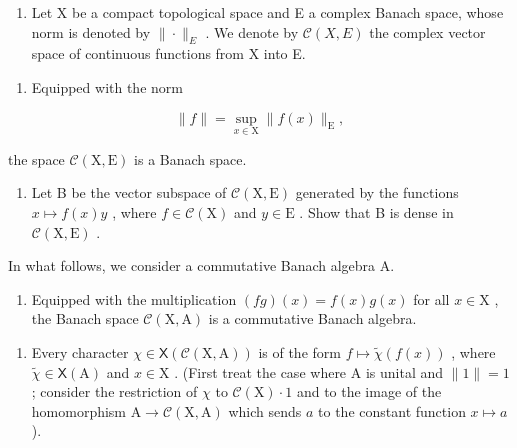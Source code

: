 \begin{enumerate}
\def\labelenumi{\arabic{enumi})}
\setcounter{enumi}{25}
\tightlist
\item
  Let X be a compact topological space and E a complex Banach space, whose norm is denoted by \(\|\cdot\|_{E}\) . We denote by \(\mathcal{C}(X,E)\) the complex vector space of continuous functions from X into E.
\end{enumerate}

\begin{enumerate}
\def\labelenumi{\alph{enumi})}
\tightlist
\item
  Equipped with the norm
\end{enumerate}

\[
\| f \| = \sup _ {x \in \mathrm{X}} \| f (x) \| _ {\mathrm{E}},
\]

the space \(\mathcal{C}(\mathrm{X},\mathrm{E})\) is a Banach space.

\begin{enumerate}
\def\labelenumi{\alph{enumi})}
\setcounter{enumi}{1}
\tightlist
\item
  Let B be the vector subspace of \(\mathcal{C}(\mathrm{X},\mathrm{E})\) generated by the functions \(x\mapsto f(x)y\) , where \(f\in \mathcal{C}(\mathrm{X})\) and \(y\in \mathrm{E}\) . Show that B is dense in \(\mathcal{C}(\mathrm{X},\mathrm{E})\) .
\end{enumerate}

In what follows, we consider a commutative Banach algebra A.

\begin{enumerate}
\def\labelenumi{\alph{enumi})}
\setcounter{enumi}{2}
\tightlist
\item
  Equipped with the multiplication \((fg)(x) = f(x)g(x)\) for all \(x\in \mathrm{X}\) , the Banach space \(\mathcal{C}(\mathrm{X},\mathrm{A})\) is a commutative Banach algebra.
\end{enumerate}

\begin{enumerate}
\def\labelenumi{\alph{enumi})}
\setcounter{enumi}{3}
\tightlist
\item
  Every character \(\chi\in\mathsf{X}(\mathcal{C}(\mathrm{X},\mathrm{A}))\) is of the form \(f\mapsto\widetilde{\chi}(f(x))\) , where \(\widetilde{\chi}\in\mathsf{X}(\mathrm{A})\) and \(x\in\mathrm{X}\) . (First treat the case where A is unital and \(\|1\|=1\) ; consider the restriction of \(\chi\) to \(\mathcal{C}(\mathrm{X})\cdot1\) and to the image of the homomorphism \(\mathrm{A}\to\mathcal{C}(\mathrm{X},\mathrm{A})\) which sends \(a\) to the constant function \(x\mapsto a\) ).
\end{enumerate}


